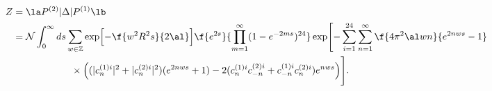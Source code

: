 \begin{equation}
\begin{split}
Z&=\la P^{(2)}|\Delta|P^{(1)} \lb \\
&={\cal N} \int_{0}^{\infty} ds
\sum_{w \in {\mathbb Z}}\exp \Bigl[-\f{w^2R^2s}{2\al}\Bigr]
 \f{e^{2s}}{ \prod_{m=1}^{\infty}(1-e^{-2ms})^{24}}
\exp\Biggl[-\sum_{i=1}^{24}
\sum_{n=1}^{\infty}\f{4\pi^2 \al wn}{e^{2nws}-1} 
 \\ & \qquad \qquad  \qquad \times \Bigl(
(|c^{(1)i}_n|^2+|c^{(2)i}_n|^2)(e^{2nws}+1)-2(c^{(1)i}_n c^{(2)i}_{-n}
+c^{(1)i}_{-n} c^{(2)i}_n) e^{nws}\Bigr)\Biggr]. \label{ampc2}
\end{split}
\end{equation}

